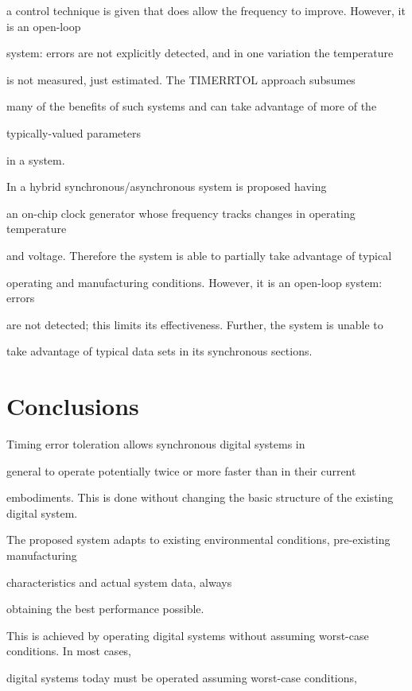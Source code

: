 \documentclass[12pt,dvips]{article}
\begin{document}
a control technique is given that does allow the frequency to improve. However, it is an open-loop

system: errors are not explicitly detected, and in one variation the temperature

is not measured, just estimated. The TIMERRTOL approach subsumes

many of the benefits of such systems and can take advantage of more of the

typically-valued parameters

in a system.



In \cite{Sjogren97} a hybrid synchronous/asynchronous system is proposed having

an on-chip clock generator whose frequency tracks changes in operating temperature

and voltage. Therefore the system is able to partially take advantage of typical

operating and manufacturing conditions. However, it is an open-loop system: errors

are not detected; this limits its effectiveness. Further, the system is unable to

take advantage of typical data sets in its synchronous sections.



\section{Conclusions}

\label{conc}

Timing error toleration allows synchronous digital systems in

general to operate potentially twice or more faster than in their current

embodiments. This is done without changing the basic structure of the existing digital system.

The proposed system adapts to existing environmental conditions, pre-existing manufacturing

characteristics and actual system data, always

obtaining the best performance possible.



This is achieved by operating digital systems without assuming worst-case conditions. In most cases,

digital systems today must be operated assuming worst-case conditions,
\end{document}
